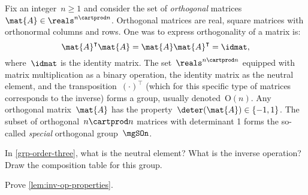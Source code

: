 \begin{example}

    Fix an integer~$n\geq 1$ and consider the set of \emph{orthogonal} matrices~$\mat{A}\in \reals^{n\cartprod n}$.
    Orthogonal matrices are real, square matrices with orthonormal columns and rows.
    One was to express orthogonality of a matrix is:
    \begin{equation*}
        \mat{A}^\intercal \mat{A}=\mat{A}\mat{A}^\intercal = \idmat,
    \end{equation*}
    where~$\idmat$ is the identity matrix.
    The set~$\reals^{n\cartprod n}$ equipped with matrix multiplication as a binary operation, the identity matrix as the neutral element, and the transposition~$(\cdot)^\intercal$ (which for this specific type of matrices corresponds to the inverse) forms a group, usually denoted~$\text{O}(n)$.
    Any orthogonal matrix~$\mat{A}$ has the property~$\deter(\mat{A})\in \{-1,1\}$.
    The subset of orthogonal~$n\cartprod n$ matrices with determinant 1 forms the so-called \emph{special} orthogonal group~$\mgSOn$.
\end{example}

\vfill%

\begin{gradedexercise}
    \label{ex:GroupWithThreeElements}
    In \cref{grp-order-three}, what is the neutral element?
    What is the inverse operation?
    Draw the composition table for this group.
\end{gradedexercise}

\begin{gradedexercise}
    \label{ex:GroupInverseProperties}
    Prove \cref{lem:inv-op-properties}.
\end{gradedexercise}

